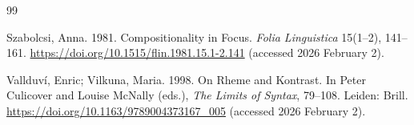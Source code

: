 \documentclass[a4paper, ruler]{CUP-JNL-LIN}%
\begin{document}
\begin{Backmatter}
\begin{thebibliography}{99}

{Szabolcsi, Anna}. 1981. Compositionality in Focus. \textit{Folia Linguistica} 15(1--2), 141--161. \url{https://doi.org/10.1515/flin.1981.15.1-2.141} (accessed 2026 February 2).




{Vallduví, Enric; Vilkuna, Maria}. 1998. On Rheme and Kontrast. In Peter Culicover and Louise McNally (eds.), \textit{The Limits of Syntax}, 79--108. Leiden: Brill. \url{https://doi.org/10.1163/9789004373167_005} (accessed 2026 February 2).





\end{thebibliography}
\end{Backmatter}
\end{document}
